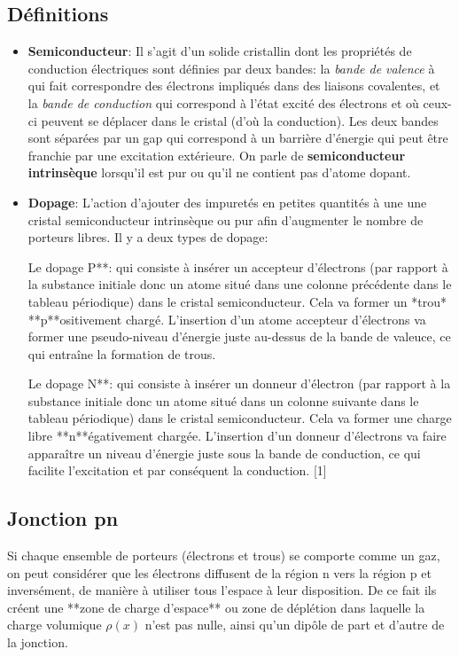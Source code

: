 \documentclass{article}
\begin{document}
            \subsection{Définitions}
                \begin{itemize}
                    \item \textbf{Semiconducteur}: Il s'agit d'un solide cristallin dont les propriétés de conduction électriques sont définies par deux bandes: la \textit{bande de valence} à qui fait correspondre des électrons impliqués dans des liaisons covalentes, et la \textit{bande de conduction} qui correspond à l'état excité des électrons et où ceux-ci peuvent se déplacer dans le cristal (d'où la conduction). Les deux bandes sont séparées par un gap qui correspond à un barrière d'énergie qui peut être franchie par une excitation extérieure. On parle de \textbf{semiconducteur intrinsèque} lorsqu'il est pur ou qu'il ne contient pas d'atome dopant.
                
                    \item \textbf{Dopage}: L'action d'ajouter des impuretés en petites quantités à une une cristal semiconducteur intrinsèque ou pur afin d'augmenter le nombre de porteurs libres. Il y a deux types de dopage:
                
                        \subitem  Le dopage P**: qui consiste à insérer un accepteur d'électrons (par rapport à la substance initiale donc un atome situé dans une colonne précédente dans le tableau périodique) dans le cristal semiconducteur. Cela va former un *trou* **p**ositivement chargé. L'insertion d'un atome accepteur d'électrons va former une pseudo-niveau d'énergie juste au-dessus de la bande de valeuce, ce qui entraîne la formation de trous.
                
                        \subitem  Le dopage N**: qui consiste à insérer un donneur d'électron (par rapport à la substance initiale donc un atome situé dans un colonne suivante dans le tableau périodique) dans le cristal semiconducteur. Cela va former une charge libre **n**égativement chargée. L'insertion d'un donneur d'électrons va faire apparaître un niveau d'énergie juste sous la bande de conduction, ce qui facilite l'excitation et par conséquent la conduction. [1]
                \end{itemize}

            \subsection{Jonction pn}
            Si chaque ensemble de porteurs (électrons et trous) se comporte comme un gaz, on peut considérer que les électrons diffusent de la région n vers la région p et inversément, de manière à utiliser tous l'espace à leur disposition. De ce fait ils créent une **zone de charge d'espace** ou zone de déplétion dans laquelle la charge volumique $\rho(x)$ n'est pas nulle, ainsi qu'un dipôle de part et d'autre de la jonction.
\end{document}
